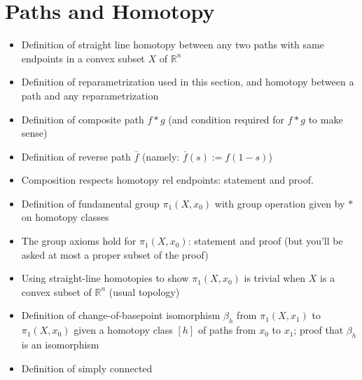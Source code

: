 \documentclass[12pt]{article}
\newcommand{\rl}{\mathbb{R}}
\begin{document}
\section{Paths and Homotopy}
\begin{itemize}
\item Definition of straight line homotopy between any two paths with same endpoints in
a convex subset $X$ of $\rl^n$


\vspace*{30mm}
\item Definition of reparametrization used in this section, and homotopy between a path
and any reparametrization


\vspace*{30mm}
\item Definition of composite path $f* g$ (and condition required for $f* g$ to make sense)


\vspace*{30mm}
\item Definition of reverse path $\bar{f}$ (namely: $\bar{f} (s) := f (1- s)$)


\vspace*{30mm}
\item Composition respects homotopy rel endpoints: statement and proof.


\vspace*{30mm}
\item Definition of fundamental group $\pi_1(X, x_0)$ with group operation given by $*$ on
homotopy classes


\vspace*{30mm}
\item The group axioms hold for $\pi_1(X, x_0)$: statement and proof (but you'll be asked at
most a proper subset of the proof)


\vspace*{30mm}
\item Using straight-line homotopies to show $\pi_1(X, x_0)$ is trivial when $X$ is a convex subset
of $\rl^n$ (usual topology)


\vspace*{30mm}
\item Definition of change-of-basepoint isomorphism $\beta_h$ from $\pi_1(X, x_1)$ to $\pi_1(X, x_0)$ given
a homotopy class $[h]$ of paths from $x_0$ to $x_1$; proof that $\beta_h$ is an isomorphism


\vspace*{30mm}
\item Definition of simply connected



\end{itemize}
\end{document}
